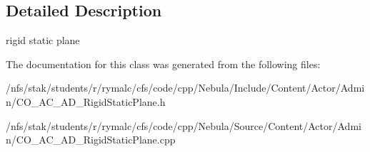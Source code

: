 \subsection{Detailed Description}
rigid static plane 

The documentation for this class was generated from the following files:\begin{DoxyCompactItemize}
\item 
/nfs/stak/students/r/rymalc/cfs/code/cpp/Nebula/Include/Content/Actor/Admin/CO\_\-AC\_\-AD\_\-RigidStaticPlane.h\item 
/nfs/stak/students/r/rymalc/cfs/code/cpp/Nebula/Source/Content/Actor/Admin/CO\_\-AC\_\-AD\_\-RigidStaticPlane.cpp\end{DoxyCompactItemize}
